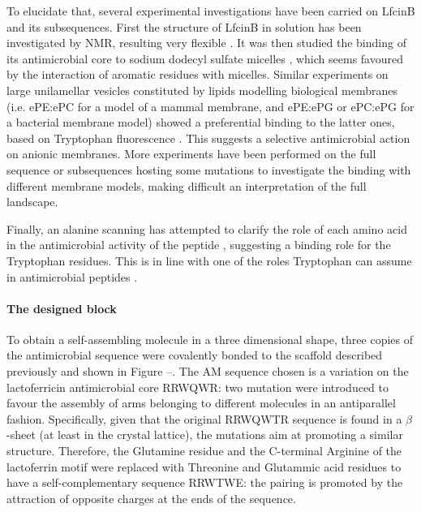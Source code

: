 To elucidate that, several experimental investigations have been carried on LfcinB and its subsequences. First the structure of LfcinB in solution has been investigated by NMR, resulting very flexible \cite{Hwang1998}. It was then studied the binding of its antimicrobial core to sodium dodecyl sulfate micelles \cite{Schibli1999}, which seems favoured by the interaction of aromatic residues with micelles.
Similar experiments on large unilamellar vesicles constituted by lipids modelling biological membranes (i.e. ePE:ePC for a model of a mammal membrane, and ePE:ePG or ePC:ePG for a bacterial membrane model)  showed a preferential binding to the latter ones, based on Tryptophan fluorescence \cite{Nguyen2015}. This suggests a selective antimicrobial action on anionic membranes.
%
More experiments have been performed on the full sequence or subsequences hosting some mutations \cite{Tsutsumi2012,Arseneault2010} to investigate the binding with different membrane models, making difficult an interpretation of the full landscape.

Finally, an alanine scanning has attempted to clarify the role of each amino acid in the antimicrobial activity of the peptide \cite{Strom2002}, suggesting a binding role for the Tryptophan residues. This is in line with one of the roles Tryptophan can assume in antimicrobial peptides \cite{Chan2006}.

\paragraph{The designed block}
To obtain a self-assembling molecule in a three dimensional shape, three copies of the antimicrobial sequence were covalently bonded to the scaffold described previously and shown in Figure --. The AM sequence chosen is a variation on the lactoferricin antimicrobial core RRWQWR: two mutation were introduced to favour the assembly of arms belonging to different molecules in an antiparallel fashion. Specifically, given that the original RRWQWTR sequence is found in a $\beta$-sheet (at least in the crystal lattice), the mutations aim at promoting a similar structure. Therefore, the Glutamine residue and the C-terminal Arginine of the lactoferrin motif were replaced with Threonine and Glutammic acid residues to have a self-complementary sequence RRWTWE: the pairing is promoted by the attraction of opposite charges at the ends of the sequence.

